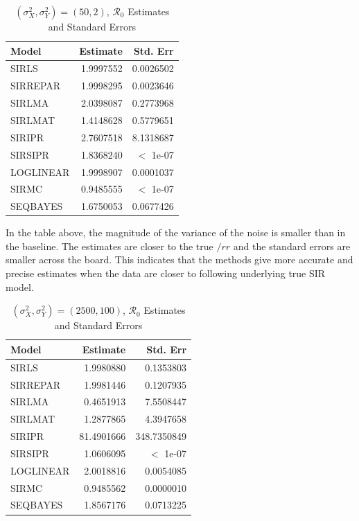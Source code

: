 \documentclass[12pt]{article}
\newcommand{\rr}{\ensuremath{\mathcal{R}_0}}
\begin{document}
\begin{table}[H]
	
	\caption{\label{tab:} $(\sigma^2_X, \sigma^2_Y) = (50, 2)$, $\rr$ Estimates and Standard Errors}
	\centering
	\begin{tabular}[t]{l|r|r}
		\hline
		Model & Estimate & Std. Err\\
		\hline
		SIRLS & 1.9997552 & 0.0026502\\
		\hline
		SIRREPAR & 1.9998295 & 0.0023646\\
		\hline
		SIRLMA & 2.0398087 & 0.2773968\\
		\hline
		SIRLMAT & 1.4148628 & 0.5779651\\
		\hline
		SIRIPR & 2.7607518 & 8.1318687\\
		\hline
		SIRSIPR & 1.8368240 & $<$ 1e-07\\
		\hline
		LOGLINEAR & 1.9998907 & 0.0001037\\
		\hline
		SIRMC & 0.9485555 & $<$ 1e-07\\
		\hline
		SEQBAYES & 1.6750053 & 0.0677426\\
		\hline
	\end{tabular}
\end{table}

In the table above, the magnitude of the variance of the noise is smaller than in the baseline. The estimates are closer to the true $/rr$ and the standard errors are smaller across the board. This indicates that the methods give more accurate and precise estimates when the data are closer to following underlying true SIR model.


\begin{table}[H]
	
	\caption{\label{tab:} $(\sigma^2_X, \sigma^2_Y) = (2500, 100)$, $\rr$ Estimates and Standard Errors}
	\centering
	\begin{tabular}[t]{l|r|r}
		\hline
		Model & Estimate & Std. Err\\
		\hline
		SIRLS & 1.9980880 & 0.1353803\\
		\hline
		SIRREPAR & 1.9981446 & 0.1207935\\
		\hline
		SIRLMA & 0.4651913 & 7.5508447\\
		\hline
		SIRLMAT & 1.2877865 & 4.3947658\\
		\hline
		SIRIPR & 81.4901666 & 348.7350849\\
		\hline
		SIRSIPR & 1.0606095 & $<$ 1e-07\\
		\hline
		LOGLINEAR & 2.0018816 & 0.0054085\\
		\hline
		SIRMC & 0.9485562 & 0.0000010\\
		\hline
		SEQBAYES & 1.8567176 & 0.0713225\\
		\hline
	\end{tabular}
\end{table}
\end{document}
